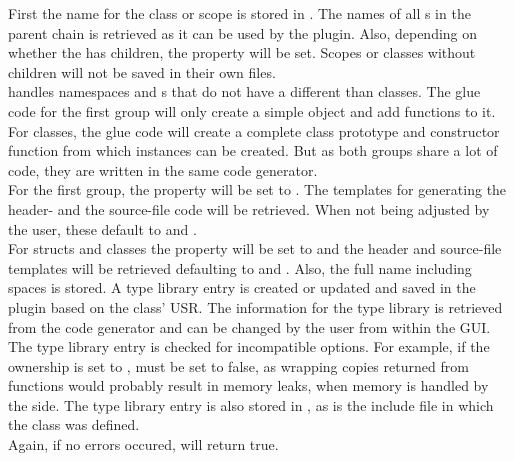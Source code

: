 First the name for the class or scope is stored in . The names of all \linebreak{}s in the parent chain is retrieved as it can be used by the plugin. Also, depending on whether the  has children, the  property will be set. Scopes or classes without children will not be saved in their own files.\\
 handles namespaces and s that do not have a  different than classes. The glue code for the first group will only create a simple  object and add functions to it. For classes, the glue code will create a complete  class prototype and constructor function from which instances can be created. But as both groups share a lot of code, they are written in the same code generator.\\
For the first group, the  property will be set to . The templates for generating the header- and the source-file code will be retrieved. When not being adjusted by the user, these default to  and .\\
For structs and classes the  property will be set to  and the header and source-file templates will be retrieved defaulting to  and . Also, the full name including spaces is stored. A type library entry is created or updated and saved in the plugin based on the class' USR. The information for the type library is retrieved from the code generator and can be changed by the user from within the GUI. The type library entry is checked for incompatible options. For example, if the ownership is set to ,  must be set to false, as wrapping copies returned from  functions would probably result in memory leaks, when memory is handled by the  side. The type library entry is also stored in , as is the include file in which the class was defined.\\
Again, if no errors occured,  will return true.

